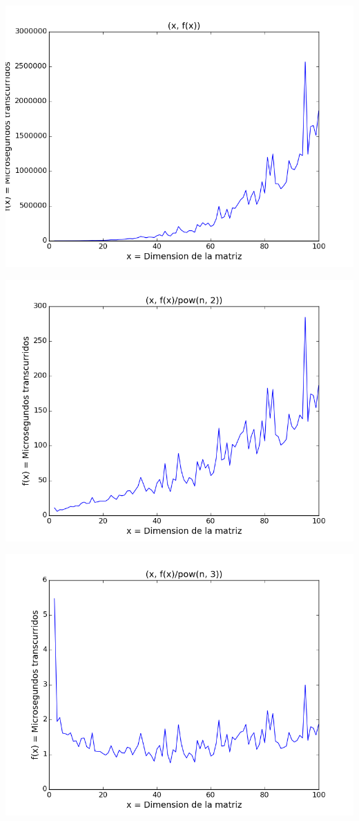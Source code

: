 \begin{center}
\includegraphics[scale=0.54]{images/4potenciafuncion}
\end{center}


\begin{center}
\includegraphics[scale=0.54]{images/4potenciasobrecuadrado}
\end{center}


\begin{center}
\includegraphics[scale=0.54]{images/4potenciasobrecubo}
\end{center}





